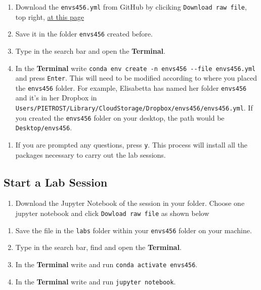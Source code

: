 \documentclass[
  letterpaper,
  DIV=11,
  numbers=noendperiod]{scrreprt}
\providecommand{\tightlist}{%
  \setlength{\itemsep}{0pt}\setlength{\parskip}{0pt}}\usepackage{longtable,booktabs,array}
\begin{document}
\begin{enumerate}
\def\labelenumi{\arabic{enumi}.}
\tightlist
\item
  Download the \texttt{envs456.yml} from GitHub by cliciking
  \texttt{Download\ raw\ file}, top right,
  \href{https://github.com/GDSL-UL/wma/blob/main/envs456.yml}{at this
  page}
\item
  Save it in the folder \texttt{envs456} created before.
\item
  Type in the search bar and open the \textbf{Terminal}.
\item
  In the \textbf{Terminal} write
  \texttt{conda\ env\ create\ -n\ envs456\ -\/-file\ envs456.yml} and
  press \texttt{Enter}. This will need to be modified according to where
  you placed the \texttt{envs456} folder. For example, Elisabetta has
  named her folder \texttt{envs456} and it's in her Dropbox in
  \texttt{Users/PIETROST/Library/CloudStorage/Dropbox/envs456/envs456.yml}.
  If you created the \texttt{envs456} folder on your desktop, the path
  would be \texttt{Desktop/envs456}.
\end{enumerate}

\begin{enumerate}
\def\labelenumi{\arabic{enumi}.}
\setcounter{enumi}{3}
\tightlist
\item
  If you are prompted any questions, press \texttt{y}. This process will
  install all the packages necessary to carry out the lab sessions.
\end{enumerate}

\hypertarget{start-a-lab-session-1}{%
\subsection*{Start a Lab Session}\label{start-a-lab-session-1}}

\begin{enumerate}
\def\labelenumi{\arabic{enumi}.}
\tightlist
\item
  Download the Jupyter Notebook of the session in your folder. Choose
  one jupyter notebook and click \texttt{Dowload\ raw\ file} as shown
  below
\end{enumerate}

\begin{enumerate}
\def\labelenumi{\arabic{enumi}.}
\setcounter{enumi}{1}
\tightlist
\item
  Save the file in the \texttt{labs} folder within your \texttt{envs456}
  folder on your machine.
\item
  Type in the search bar, find and open the \textbf{Terminal}.
\item
  In the \textbf{Terminal} write and run
  \texttt{conda\ activate\ envs456}.
\item
  In the \textbf{Terminal} write and run \texttt{jupyter\ notebook}.
\end{enumerate}
\end{document}
